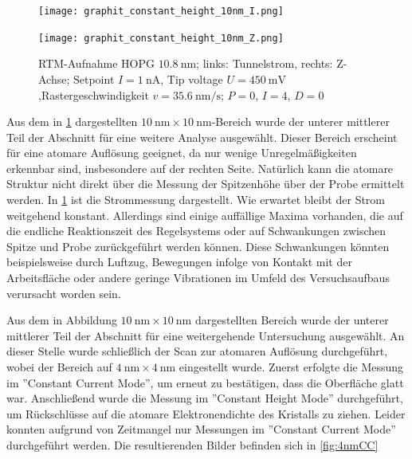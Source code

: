 \begin{figure}[H]
    \centering
    \begin{minipage}[t]{0.495\textwidth}
        \centering
        \texttt{[image: graphit\_constant\_height\_10nm\_I.png]}
    \end{minipage}
    \hfill
    \begin{minipage}[t]{0.495\textwidth}
        \centering
        \texttt{[image: graphit\_constant\_height\_10nm\_Z.png]}
    \end{minipage}
    \caption{
      RTM-Aufnahme HOPG $\SI{10.8}{\nm}$; links: Tunnelstrom, rechts: Z-Achse; Setpoint $I = \SI{1}{\nano\ampere}$, Tip voltage $U = \SI{450}{\milli\volt}$,Rastergeschwindigkeit $v = \SI{35.6}{\nano\meter\per\second}$; $P = 0$, $I = 4$, $D = 0$
}
    \label{fig:10nmCH}
\end{figure}
Aus dem in \cref{fig:10nmCH} dargestellten $\SI{10}{\nm} \times \SI{10}{\nm}$-Bereich wurde der unterer mittlerer Teil der Abschnitt für eine weitere Analyse ausgewählt. 
Dieser Bereich erscheint für eine atomare Auflösung geeignet, da nur wenige Unregelmäßigkeiten erkennbar sind, insbesondere auf der rechten Seite. Natürlich kann die atomare Struktur nicht direkt über die Messung der Spitzenhöhe über der Probe ermittelt werden. 
In \cref{fig:10nmCH} ist die Strommessung dargestellt. Wie erwartet bleibt der Strom weitgehend konstant. 
Allerdings sind einige auffällige Maxima vorhanden, die auf die endliche Reaktionszeit des Regelsystems oder auf Schwankungen zwischen Spitze und Probe zurückgeführt werden können. 
Diese Schwankungen könnten beispielsweise durch Luftzug, Bewegungen infolge von Kontakt mit der Arbeitsfläche oder andere geringe Vibrationen im Umfeld des Versuchsaufbaus verursacht worden sein.

Aus dem in Abbildung $\SI{10}{\nm} \times \SI{10}{\nm}$ dargestellten Bereich wurde der unterer mittlerer Teil der Abschnitt für eine weitergehende Untersuchung ausgewählt. 
An dieser Stelle wurde schließlich der Scan zur atomaren Auflösung durchgeführt, wobei der Bereich auf $\SI{4}{\nm} \times \SI{4}{\nm}$ eingestellt wurde. 
Zuerst erfolgte die Messung im ''Constant Current Mode'', um erneut zu bestätigen, dass die Oberfläche glatt war. Anschließend wurde die Messung im ''Constant Height Mode'' durchgeführt, um Rückschlüsse auf die atomare Elektronendichte des Kristalls zu ziehen. Leider konnten aufgrund von Zeitmangel nur Messungen im ''Constant Current Mode'' durchgeführt werden. Die resultierenden Bilder befinden sich in \cref{fig:4nmCC}

